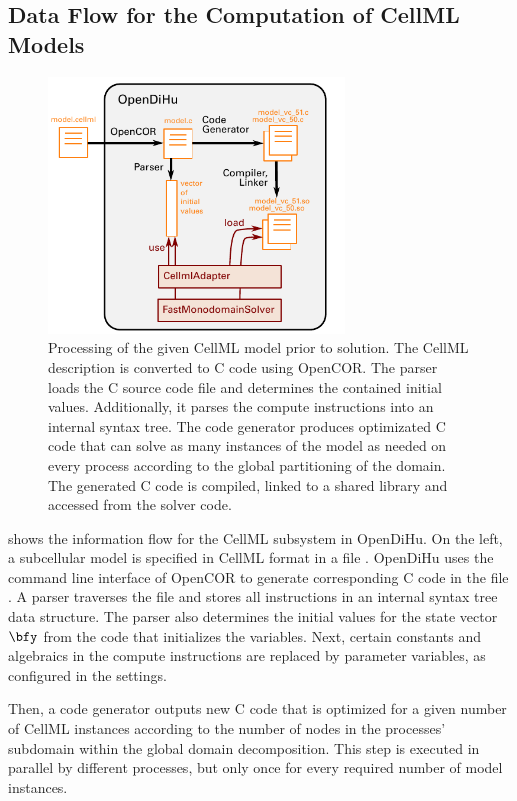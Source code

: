 \subsection{Data Flow for the Computation of CellML Models}

\begin{figure}%
  \centering%
  \includegraphics[width=0.7\textwidth]{images/implementation/cellml_scheme.pdf}%
  \caption{Processing of the given CellML model prior to solution. The CellML description is converted to C code using OpenCOR. The parser loads the C source code file and determines the contained initial values. Additionally, it parses the compute instructions into an internal syntax tree. The code generator produces optimizated C code that can solve as many instances of the model as needed on every process according to the global partitioning of the domain. The generated C code is compiled, linked to a shared library and accessed from the solver code.}
  \label{fig:cellml_scheme}%
\end{figure}%

 shows the information flow for the CellML subsystem in OpenDiHu. On the left, a subcellular model is specified in CellML format in a file . OpenDiHu uses the command line interface of OpenCOR to generate corresponding C code in the file . A parser traverses the file and stores all instructions in an internal syntax tree data structure. The parser also determines the initial values for the state vector $\bfy$ from the code that initializes the variables.
Next, certain constants and algebraics in the compute instructions are replaced by parameter variables, as configured in the settings.

Then, a code generator outputs new C code that is optimized for a given number of CellML instances according to the number of nodes in the processes' subdomain within the global domain decomposition. 
This step is executed in parallel by different processes, but only once for every required number of model instances.

